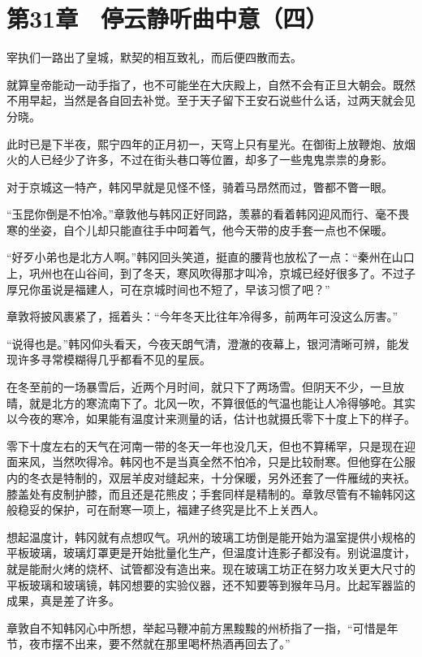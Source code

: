 \section{第31章　停云静听曲中意（四）}

宰执们一路出了皇城，默契的相互致礼，而后便四散而去。

就算皇帝能动一动手指了，也不可能坐在大庆殿上，自然不会有正旦大朝会。既然不用早起，当然是各自回去补觉。至于天子留下王安石说些什么话，过两天就会见分晓。

此时已是下半夜，熙宁四年的正月初一，天穹上只有星光。在御街上放鞭炮、放烟火的人已经少了许多，不过在街头巷口等位置，却多了一些鬼鬼祟祟的身影。

对于京城这一特产，韩冈早就是见怪不怪，骑着马昂然而过，瞥都不瞥一眼。

“玉昆你倒是不怕冷。”章敦他与韩冈正好同路，羡慕的看着韩冈迎风而行、毫不畏寒的坐姿，自个儿却只能直往手中呵着气，他今天带的皮手套一点也不保暖。

“好歹小弟也是北方人啊。”韩冈回头笑道，挺直的腰背也放松了一点：“秦州在山口上，巩州也在山谷间，到了冬天，寒风吹得那才叫冷，京城已经好很多了。不过子厚兄你虽说是福建人，可在京城时间也不短了，早该习惯了吧？”

章敦将披风裹紧了，摇着头：“今年冬天比往年冷得多，前两年可没这么厉害。”

“说得也是。”韩冈仰头看天，今夜天朗气清，澄澈的夜幕上，银河清晰可辨，能发现许多寻常模糊得几乎都看不见的星辰。

在冬至前的一场暴雪后，近两个月时间，就只下了两场雪。但阴天不少，一旦放晴，就是北方的寒流南下了。北风一吹，不算很低的气温也能让人冷得够呛。其实以今夜的寒冷，如果能有温度计来测量的话，估计也就摄氏零下十度上下的样子。

零下十度左右的天气在河南一带的冬天一年也没几天，但也不算稀罕，只是现在迎面来风，当然吹得冷。韩冈也不是当真全然不怕冷，只是比较耐寒。但他穿在公服内的冬衣是特制的，双层羊皮对缝起来，十分保暖，另外还套了一件雁绒的夹袄。膝盖处有皮制护膝，而且还是花熊皮；手套同样是精制的。章敦尽管有不输韩冈这般稳妥的保护，可在耐寒一项上，福建子终究是比不上关西人。

想起温度计，韩冈就有点想叹气。巩州的玻璃工坊倒是能开始为温室提供小规格的平板玻璃，玻璃灯罩更是开始批量化生产，但温度计连影子都没有。别说温度计，就是能耐火烤的烧杯、试管都没有造出来。现在玻璃工坊正在努力攻关更大尺寸的平板玻璃和玻璃镜，韩冈想要的实验仪器，还不知要等到猴年马月。比起军器监的成果，真是差了许多。

章敦自不知韩冈心中所想，举起马鞭冲前方黑黢黢的州桥指了一指，“可惜是年节，夜市摆不出来，要不然就在那里喝杯热酒再回去了。”

